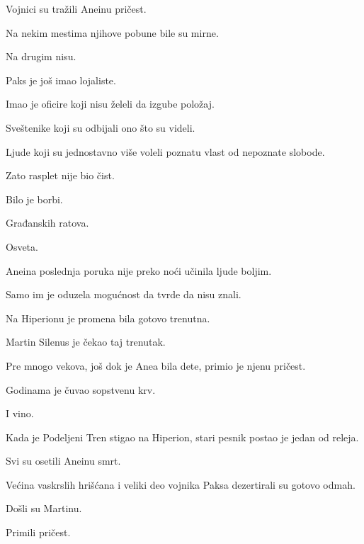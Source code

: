 Vojnici su tražili Aneinu pričest.

\bigskip

Na nekim mestima njihove pobune bile su mirne.

Na drugim nisu.

\bigskip

Paks je još imao lojaliste.

Imao je oficire koji nisu želeli da izgube položaj.

Sveštenike koji su odbijali ono što su videli.

Ljude koji su jednostavno više voleli poznatu vlast od nepoznate slobode.

\bigskip

Zato rasplet nije bio čist.

\bigskip

Bilo je borbi.

Građanskih ratova.

Osveta.

\bigskip

Aneina poslednja poruka nije preko noći učinila ljude boljim.

\bigskip

Samo im je oduzela mogućnost da tvrde da nisu znali.

\bigskip

Na Hiperionu je promena bila gotovo trenutna.

\bigskip

Martin Silenus je čekao taj trenutak.

\bigskip

Pre mnogo vekova, još dok je Anea bila dete, primio je njenu pričest.

\bigskip

Godinama je čuvao sopstvenu krv.

I vino.

\bigskip

Kada je Podeljeni Tren stigao na Hiperion, stari pesnik postao je jedan od releja.

\bigskip

Svi su osetili Aneinu smrt.

\bigskip

Većina vaskrslih hrišćana i veliki deo vojnika Paksa dezertirali su gotovo odmah.

\bigskip

Došli su Martinu.

\bigskip

Primili pričest.

